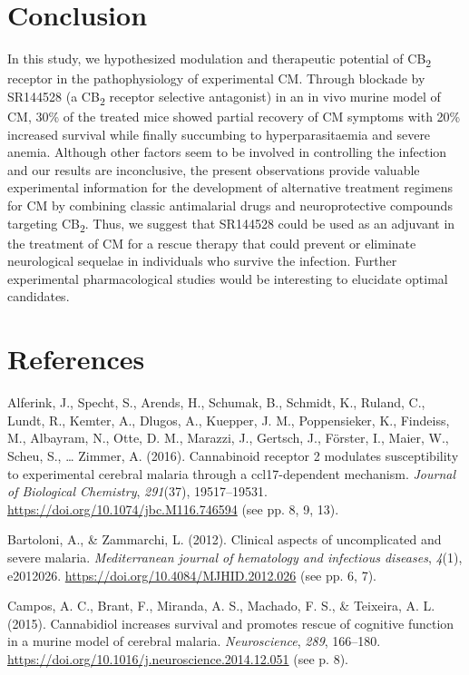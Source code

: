 \documentclass[empirical, authordate, issue]{jote-new-article}
\begin{document}
\section{Conclusion}

In this study, we hypothesized modulation and therapeutic potential of CB\textsubscript{2} receptor in the pathophysiology of experimental CM. Through blockade by SR144528 (a CB\textsubscript{2} receptor selective antagonist) in an in vivo murine model of CM, 30\% of the treated mice showed partial recovery of CM symptoms with 20\% increased survival while finally succumbing to hyperparasitaemia and severe anemia. Although other factors seem to be involved in controlling the infection and our results are inconclusive, the present observations provide valuable experimental information for the development of alternative treatment regimens for CM by combining classic antimalarial drugs and neuroprotective compounds targeting CB\textsubscript{2}. Thus, we suggest that SR144528 could be used as an adjuvant in the treatment of CM for a rescue therapy that could prevent or eliminate neurological sequelae in individuals who survive the infection. Further experimental pharmacological studies would be interesting to elucidate optimal candidates.

\section{References}

Alferink, J., Specht, S., Arends, H., Schumak, B., Schmidt, K., Ruland, C., Lundt, R., Kemter, A., Dlugos, A., Kuepper, J. M., Poppensieker, K., Findeiss, M., Albayram, N., Otte, D. M., Marazzi, J., Gertsch, J., Förster, I., Maier, W., Scheu, S., … Zimmer, A. (2016). Cannabinoid receptor 2 modulates susceptibility to experimental cerebral malaria through a ccl17-dependent mechanism. \emph{Journal of Biological Chemistry}, \emph{291}(37), 19517–19531. \url{https://doi.org/10.1074/jbc.M116.746594} (see pp. 8, 9, 13).

Bartoloni, A., \& Zammarchi, L. (2012). Clinical aspects of uncomplicated and severe malaria. \emph{Mediterranean journal of hematology and infectious diseases}, \emph{4}(1), e2012026. \url{https://doi.org/10.4084/MJHID.2012.026} (see pp. 6, 7).

Campos, A. C., Brant, F., Miranda, A. S., Machado, F. S., \& Teixeira, A. L. (2015). Cannabidiol increases survival and promotes rescue of cognitive function in a murine model of cerebral malaria. \emph{Neuroscience}, \emph{289}, 166–180. \url{https://doi.org/10.1016/j.neuroscience.2014.12.051} (see p. 8).
\end{document}
